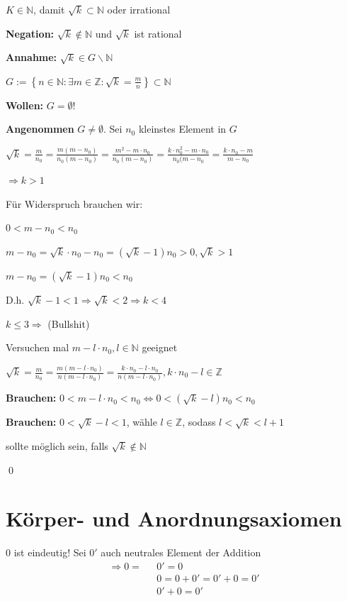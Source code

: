 \documentclass[fleqn]{scrbook}
\newcommand{\N}{\mathbb{N}}
\renewenvironment{proof}{{\bfseries Beweis }}{\qed}
\newenvironment{example}{{\bfseries Beispiel }}{}
\begin{document}
$K \in \N$, damit $\sqrt{k} \subset \N$ oder irrational

\begin{proof}

\textbf{Negation:} $\sqrt{k} \notin \N$ und $\sqrt{k}$ ist rational

\textbf{Annahme:} $\sqrt{k} \in G \backslash \N$

$G:=\left\{ n \in \N: \exists m \in \mathbb{Z}: \sqrt{k} = \frac{m}{n} \right\} \subset \N$

\textbf{Wollen:} $G = \emptyset$!

\textbf{Angenommen} $G \neq \emptyset$. Sei $n_0$ kleinstes Element in $G$

$\sqrt{k} = \frac{m}{n_0} = \frac{m(m-n_0)}{n_0(m-n_0)} = \frac{m^2-m \cdot n_0}{n_0(m-n_0)} = \frac{k \cdot n_0^2-m \cdot n_0}{n_0(m-n_0} = \frac{k \cdot n_0-m}{m-n_0}$ 

$\Longrightarrow k>1$

Für Widerspruch brauchen wir:

$0<m-n_0<n_0$

$m-n_0 = \sqrt{k} \cdot n_0-n_0=(\sqrt{k}-1)n_0>0,\sqrt{k}>1$ 

$m-n_0 = (\sqrt{k}-1)n_0 < n_0$

D.h. $\sqrt{k} -1<1 \Longrightarrow \sqrt{k}<2 \Longrightarrow k<4$

$k \leq 3 \Longrightarrow $ (Bullshit)

Versuchen mal $m-l \cdot n_0,l \in \N$ geeignet

$\sqrt{k} = \frac{m}{n_0} = \frac{m(m-l \cdot n_0)}{n(m-l \cdot n_0)} = \frac{k \cdot n_0-l \cdot n_0}{n(m-l \cdot n_0)}, k \cdot n_0-l \in \mathbb{Z}$

\textbf{Brauchen:}  $0<m-l \cdot n_0<n_0 \Longleftrightarrow 0<(\sqrt{k}-l)n_0<n_0$ 

\textbf{Brauchen:}  $0<\sqrt{k}-l<1$, wähle $l \in \mathbb{Z}$, sodass $l < \sqrt{k}<l+1$

sollte möglich sein, falls $\sqrt{k} \notin \N$ 

\end{proof}

\section{Körper- und Anordnungsaxiomen}
  \begin{example}
    $0$ ist eindeutig!
    Sei $0'$ auch neutrales Element der Addition
    \begin{align*}
      \Longrightarrow 0 = \text{ }& 0' = 0\\
                      & 0  = 0+0'=0'+0=0'\\
                      & 0' + 0=0'
    \end{align*}
  \end{example}
\end{document}
